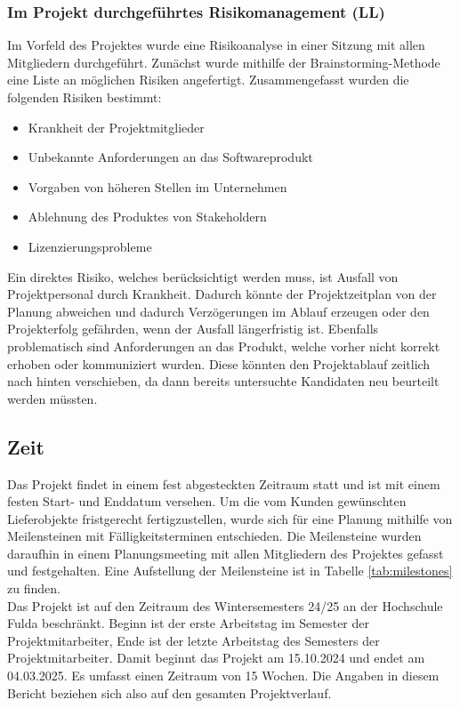 \documentclass[ThesisDJ.tex]{subfiles}
\begin{document}
\subsubsection{Im Projekt durchgeführtes Risikomanagement (LL)}
Im Vorfeld des Projektes wurde eine Risikoanalyse in einer Sitzung mit allen Mitgliedern durchgeführt. Zunächst wurde mithilfe der Brainstorming-Methode eine Liste an möglichen Risiken angefertigt. Zusammengefasst wurden die folgenden Risiken bestimmt:

\begin{itemize}
    \item Krankheit der Projektmitglieder
    \item Unbekannte Anforderungen an das Softwareprodukt
    \item Vorgaben von höheren Stellen im Unternehmen
    \item Ablehnung des Produktes von Stakeholdern
    \item Lizenzierungsprobleme
\end{itemize}

Ein direktes Risiko, welches berücksichtigt werden muss, ist Ausfall von Projektpersonal durch Krankheit. Dadurch könnte der Projektzeitplan von der Planung abweichen und dadurch Verzögerungen im Ablauf erzeugen oder den Projekterfolg gefährden, wenn der Ausfall längerfristig ist. Ebenfalls problematisch sind Anforderungen an das Produkt, welche vorher nicht korrekt erhoben oder kommuniziert wurden. Diese könnten den Projektablauf zeitlich nach hinten verschieben, da dann bereits untersuchte Kandidaten neu beurteilt werden müssten.

\subsection{Zeit}
Das Projekt findet in einem fest abgesteckten Zeitraum statt und ist mit einem festen Start- und Enddatum versehen.
Um die vom Kunden gewünschten Lieferobjekte fristgerecht fertigzustellen, wurde sich für eine Planung mithilfe von Meilensteinen mit
Fälligkeitsterminen entschieden. Die Meilensteine wurden daraufhin in einem Planungsmeeting mit allen Mitgliedern des Projektes gefasst und festgehalten.
Eine Aufstellung der Meilensteine ist in Tabelle \ref{tab:milestones} zu finden.\\

Das Projekt ist auf den Zeitraum des Wintersemesters 24/25 an der Hochschule Fulda beschränkt.
Beginn ist der erste Arbeitstag im Semester der Projektmitarbeiter, Ende ist der letzte Arbeitstag des Semesters der Projektmitarbeiter. 
Damit beginnt das Projekt am 15.10.2024 und endet am 04.03.2025. Es umfasst einen Zeitraum von 15 Wochen. 
Die Angaben in diesem Bericht beziehen sich also auf den gesamten Projektverlauf.
\end{document}

